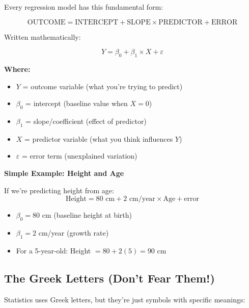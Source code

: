 \documentclass[11pt,a4paper]{article}
\begin{document}
Every regression model has this fundamental form:

\begin{equation}
\boxed{\text{OUTCOME} = \text{INTERCEPT} + \text{SLOPE} \times \text{PREDICTOR} + \text{ERROR}}
\end{equation}

Written mathematically:

\begin{equation}
Y = \beta_0 + \beta_1 \times X + \varepsilon
\end{equation}

\textbf{Where:}
\begin{itemize}[leftmargin=*]
    \item $Y$ = outcome variable (what you're trying to predict)
    \item $\beta_0$ = intercept (baseline value when $X = 0$)
    \item $\beta_1$ = slope/coefficient (effect of predictor)
    \item $X$ = predictor variable (what you think influences $Y$)
    \item $\varepsilon$ = error term (unexplained variation)
\end{itemize}

\begin{example}
\textbf{Simple Example: Height and Age}

If we're predicting height from age:
\[
\text{Height} = 80\text{ cm} + 2\text{ cm/year} \times \text{Age} + \text{error}
\]

\begin{itemize}
    \item $\beta_0 = 80$ cm (baseline height at birth)
    \item $\beta_1 = 2$ cm/year (growth rate)
    \item For a 5-year-old: Height $= 80 + 2(5) = 90$ cm
\end{itemize}
\end{example}

\subsection{The Greek Letters (Don't Fear Them!)}

Statistics uses Greek letters, but they're just symbols with specific meanings:
\end{document}
